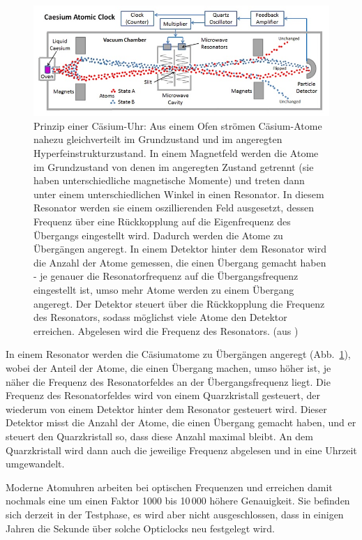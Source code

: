 \begin{figure}[htb]
\includegraphics[scale=0.5]{./Bilder/Atomic_Clock.jpg}
\caption{\label{fig_Atomuhr}%
Prinzip einer C\"asium-Uhr: Aus einem Ofen str\"omen C\"asium-Atome nahezu gleichverteilt im
Grundzustand und im angeregten Hyperfeinstrukturzustand. In einem Magnetfeld werden die
Atome im Grundzustand von denen im angeregten Zustand getrennt (sie haben unterschiedliche
magnetische Momente) und treten dann unter einem unterschiedlichen Winkel in einen
Resonator. In diesem Resonator werden sie einem oszillierenden Feld ausgesetzt, dessen Frequenz
\"uber eine R\"uckkopplung auf die Eigenfrequenz des \"Ubergangs eingestellt wird. Dadurch werden die
Atome zu \"Uberg\"angen angeregt. In einem Detektor hinter dem Resonator wird die Anzahl der Atome
gemessen, die einen \"Ubergang gemacht haben - je genauer die Resonatorfrequenz auf die
\"Ubergangsfrequenz eingestellt ist, umso mehr Atome werden zu einem \"Ubergang angeregt. Der
Detektor steuert \"uber die R\"uckkopplung die Frequenz des Resonators, sodass m\"oglichst viele
Atome den Detektor erreichen. Abgelesen wird die Frequenz des Resonators. (aus \cite{Atomuhr})}   
\end{figure}

In einem Resonator werden die C\"asiumatome zu \"Uberg\"angen angeregt (Abb.\ \ref{fig_Atomuhr}), wobei
der Anteil der Atome, die einen \"Ubergang machen, umso h\"oher ist, je n\"aher die Frequenz des
Resonatorfeldes an der \"Ubergangsfrequenz liegt. Die Frequenz des Resonatorfeldes wird von einem
Quarzkristall gesteuert, der wiederum von einem Detektor hinter dem Resonator gesteuert wird. 
Dieser Detektor misst die Anzahl der Atome, die einen \"Ubergang gemacht haben, und er steuert den
Quarzkristall so, dass diese Anzahl maximal bleibt. An dem Quarzkristall wird dann auch die jeweilige
Frequenz abgelesen und in eine Uhrzeit umgewandelt. 

Moderne 
Atomuhren arbeiten bei optischen Frequenzen und erreichen damit nochmals eine um
einen Faktor 1000 bis 10\,000 h\"ohere Genauigkeit. Sie befinden sich derzeit in der Testphase,
es wird aber nicht ausgeschlossen, dass in einigen Jahren die Sekunde \"uber solche Opticlocks
neu festgelegt wird. 

